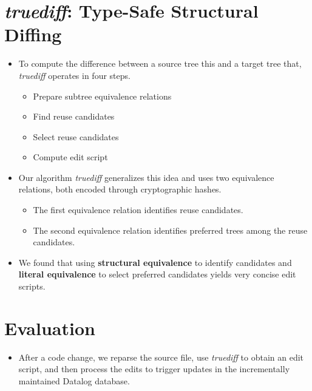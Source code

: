 \section{\textit{truediff}: Type-Safe Structural Diffing}
\begin{itemize}
    \item To compute the difference between a source tree this and a target tree that, \textit{truediff} operates in four steps.
    \begin{itemize}
        \item Prepare subtree equivalence relations
        \item Find reuse candidates
        \item Select reuse candidates
        \item Compute edit script
    \end{itemize}
    \item Our algorithm \textit{truediff} generalizes this idea and uses two equivalence relations, both encoded through cryptographic hashes.
    \begin{itemize}
        \item The first equivalence relation identifies reuse candidates.
        \item The second equivalence relation identifies preferred trees among the reuse candidates.
    \end{itemize}
    \item We found that using \textbf{structural equivalence} to identify candidates and \textbf{literal equivalence} to select preferred candidates yields very concise edit scripts.
\end{itemize}

\section{Evaluation}
\begin{itemize}
    \item After a code change, we reparse the source file, use \textit{truediff} to obtain an edit script, and then process the edits to trigger updates in the incrementally maintained Datalog database.
\end{itemize}

